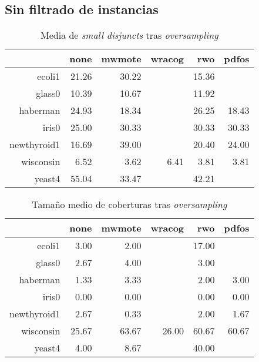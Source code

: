 \subsection{Sin filtrado de instancias}
  \begin{table}[H]
  \centering
  \begin{tabular}{rrrrrr}
  \hline
  & none & mwmote & wracog & rwo & pdfos \\ 
  \hline
  ecoli1 & 21.26 & 30.22 &  & 15.36 &  \\ 
  glass0 & 10.39 & 10.67 &  & 11.92 &  \\ 
  haberman & 24.93 & 18.34 &  & 26.25 & 18.43 \\ 
  iris0 & 25.00 & 30.33 &  & 30.33 & 30.33 \\ 
  newthyroid1 & 16.69 & 39.00 &  & 20.40 & 24.00 \\ 
  wisconsin & 6.52 & 3.62 & 6.41 & 3.81 & 3.81 \\ 
  yeast4 & 55.04 & 33.47 &  & 42.21 &  \\ 
  \hline
  \end{tabular}
  \caption{Media de \textit{small disjuncts} tras \textit{oversampling}}
  \end{table}

  \begin{table}[H]
  \centering
  \begin{tabular}{rrrrrr}
  \hline
  & none & mwmote & wracog & rwo & pdfos \\ 
  \hline
  ecoli1 & 3.00 & 2.00 &  & 17.00 &  \\ 
  glass0 & 2.67 & 4.00 &  & 3.00 &  \\ 
  haberman & 1.33 & 3.33 &  & 2.00 & 3.00 \\ 
  iris0 & 0.00 & 0.00 &  & 0.00 & 0.00 \\ 
  newthyroid1 & 2.67 & 0.33 &  & 2.00 & 1.67 \\ 
  wisconsin & 25.67 & 63.67 & 26.00 & 60.67 & 60.67 \\ 
  yeast4 & 4.00 & 8.67 &  & 40.00 &  \\ 
  \hline
  \end{tabular}
  \caption{Tamaño medio de coberturas tras \textit{oversampling}}
  \end{table}
  
